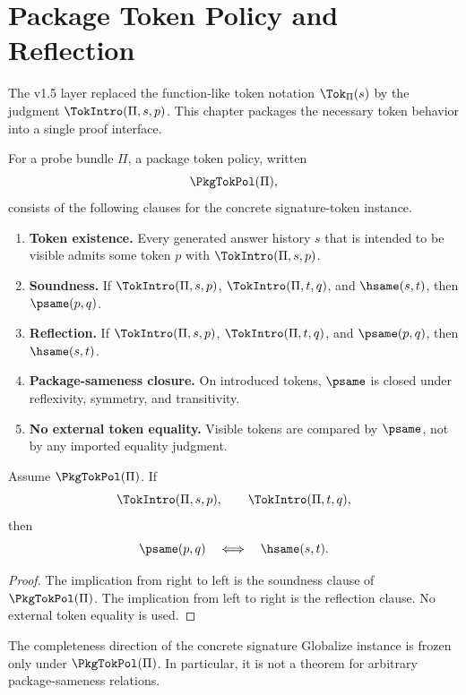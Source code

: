 \chapter{Package Token Policy and Reflection}
\label{ch:v151-package-token-policy}

The v1.5 layer replaced the function-like token notation \(\Tok_{\Pi}(s)\) by the judgment \(\TokIntro(\Pi,s,p)\). This chapter packages the necessary token behavior into a single proof interface.

\begin{definition}
For a probe bundle \(\Pi\), a package token policy, written
\[
  \PkgTokPol(\Pi),
\]
consists of the following clauses for the concrete signature-token instance.
\begin{enumerate}
  \item \textbf{Token existence.} Every generated answer history \(s\) that is intended to be visible admits some token \(p\) with \(\TokIntro(\Pi,s,p)\).
  \item \textbf{Soundness.} If \(\TokIntro(\Pi,s,p)\), \(\TokIntro(\Pi,t,q)\), and \(\hsame(s,t)\), then \(\psame(p,q)\).
  \item \textbf{Reflection.} If \(\TokIntro(\Pi,s,p)\), \(\TokIntro(\Pi,t,q)\), and \(\psame(p,q)\), then \(\hsame(s,t)\).
  \item \textbf{Package-sameness closure.} On introduced tokens, \(\psame\) is closed under reflexivity, symmetry, and transitivity.
  \item \textbf{No external token equality.} Visible tokens are compared by \(\psame\), not by any imported equality judgment.
\end{enumerate}
\end{definition}

\begin{theorem}
\label{thm:v151-psame-iff-hsame}
Assume \(\PkgTokPol(\Pi)\). If
\[
  \TokIntro(\Pi,s,p),
  \qquad
  \TokIntro(\Pi,t,q),
\]
then
\[
  \psame(p,q)
  \quad\Longleftrightarrow\quad
  \hsame(s,t).
\]
\end{theorem}

\begin{proof}
The implication from right to left is the soundness clause of \(\PkgTokPol(\Pi)\). The implication from left to right is the reflection clause. No external token equality is used.
\end{proof}

\begin{corollary}
The completeness direction of the concrete signature Globalize instance is frozen only under \(\PkgTokPol(\Pi)\). In particular, it is not a theorem for arbitrary package-sameness relations.
\end{corollary}

